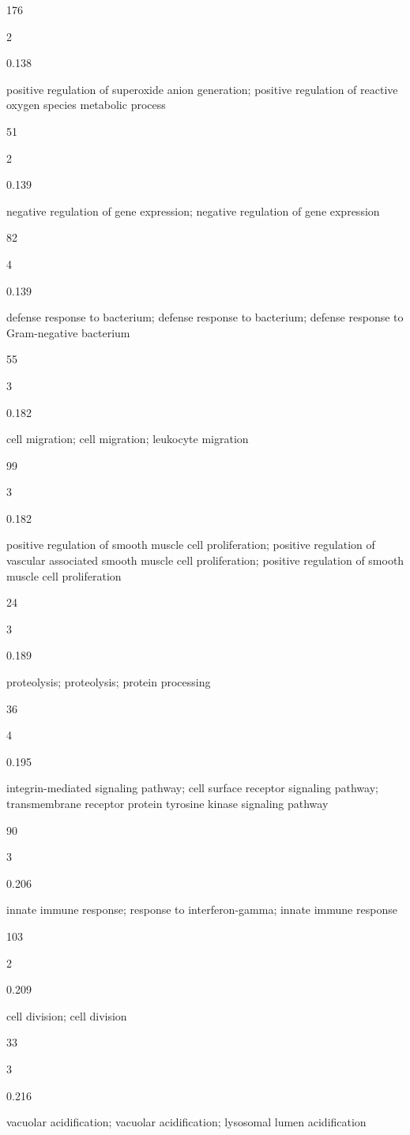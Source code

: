 \documentclass[
  letterpaper,
  DIV=11,
  numbers=noendperiod,
  openany,
  oneside]{scrreprt}
\begin{document}
176

2

0.138

positive regulation of superoxide anion generation; positive regulation
of reactive oxygen species metabolic process

51

2

0.139

negative regulation of gene expression; negative regulation of gene
expression

82

4

0.139

defense response to bacterium; defense response to bacterium; defense
response to Gram-negative bacterium

55

3

0.182

cell migration; cell migration; leukocyte migration

99

3

0.182

positive regulation of smooth muscle cell proliferation; positive
regulation of vascular associated smooth muscle cell proliferation;
positive regulation of smooth muscle cell proliferation

24

3

0.189

proteolysis; proteolysis; protein processing

36

4

0.195

integrin-mediated signaling pathway; cell surface receptor signaling
pathway; transmembrane receptor protein tyrosine kinase signaling
pathway

90

3

0.206

innate immune response; response to interferon-gamma; innate immune
response

103

2

0.209

cell division; cell division

33

3

0.216

vacuolar acidification; vacuolar acidification; lysosomal lumen
acidification
\end{document}
